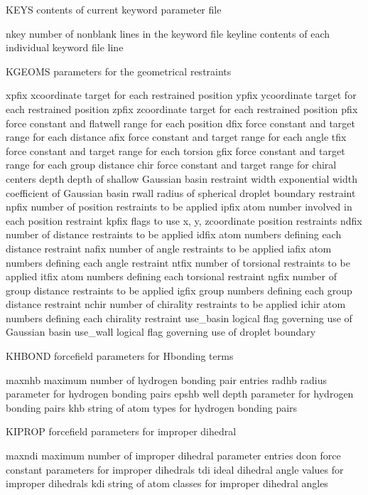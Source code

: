 \documentclass[letterpaper,11pt,english]{sphinxmanual}
\begin{document}
KEYS    contents of current keyword parameter file

nkey    number of nonblank lines in the keyword file
keyline contents of each individual keyword file line

KGEOMS  parameters for the geometrical restraints

xpfix   x\sphinxhyphen{}coordinate target for each restrained position
ypfix   y\sphinxhyphen{}coordinate target for each restrained position
zpfix   z\sphinxhyphen{}coordinate target for each restrained position
pfix    force constant and flat\sphinxhyphen{}well range for each position
dfix    force constant and target range for each distance
afix    force constant and target range for each angle
tfix    force constant and target range for each torsion
gfix    force constant and target range for each group distance
chir    force constant and target range for chiral centers
depth   depth of shallow Gaussian basin restraint
width   exponential width coefficient of Gaussian basin
rwall   radius of spherical droplet boundary restraint
npfix   number of position restraints to be applied
ipfix   atom number involved in each position restraint
kpfix   flags to use x\sphinxhyphen{}, y\sphinxhyphen{}, z\sphinxhyphen{}coordinate position restraints
ndfix   number of distance restraints to be applied
idfix   atom numbers defining each distance restraint
nafix   number of angle restraints to be applied
iafix   atom numbers defining each angle restraint
ntfix   number of torsional restraints to be applied
itfix   atom numbers defining each torsional restraint
ngfix   number of group distance restraints to be applied
igfix   group numbers defining each group distance restraint
nchir   number of chirality restraints to be applied
ichir   atom numbers defining each chirality restraint
use\_basin       logical flag governing use of Gaussian basin
use\_wall        logical flag governing use of droplet boundary

KHBOND  forcefield parameters for H\sphinxhyphen{}bonding terms

maxnhb  maximum number of hydrogen bonding pair entries
radhb   radius parameter for hydrogen bonding pairs
epshb   well depth parameter for hydrogen bonding pairs
khb     string of atom types for hydrogen bonding pairs

KIPROP  forcefield parameters for improper dihedral

maxndi  maximum number of improper dihedral parameter entries
dcon    force constant parameters for improper dihedrals
tdi     ideal dihedral angle values for improper dihedrals
kdi     string of atom classes for improper dihedral angles
\end{document}
